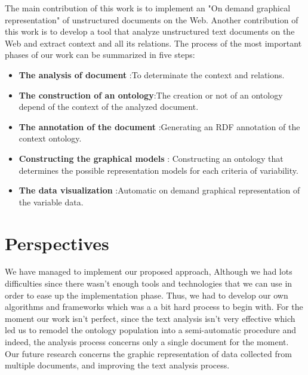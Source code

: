 The main contribution of this work is to implement an "On demand graphical representation" of unstructured documents on the Web. Another contribution of this work is to develop a tool that analyze unstructured text documents on the Web and extract context and all its relations. The process of the most important phases of our work can be summarized in five steps: 
 \begin{itemize}
    \item \textbf{The analysis of document} :To determinate the context and relations.
    \item \textbf{The construction of an ontology}:The creation or not of an ontology depend of the context of the analyzed document.
    \item \textbf{The annotation of the document} :Generating an RDF annotation of the context ontology.
    \item \textbf{Constructing the graphical models} : Constructing an ontology that determines the possible representation models for each criteria of variability.
    \item \textbf{The data visualization} :Automatic on demand graphical representation of the variable data.
    
    \end{itemize}
    \section*{Perspectives}
We have managed to implement our proposed approach, Although we had lots difficulties since there wasn't enough tools and technologies that we can use in order to ease up the implementation phase. Thus, we had to develop our own algorithms and frameworks which was a a bit hard process to begin with.
For the moment our work isn't perfect, since the text analysis isn't very effective which led us to remodel the ontology population into a semi-automatic procedure and indeed, the analysis process concerns only a single document for the moment. Our future research concerns the graphic representation of data collected from multiple documents, and improving the text analysis process.
